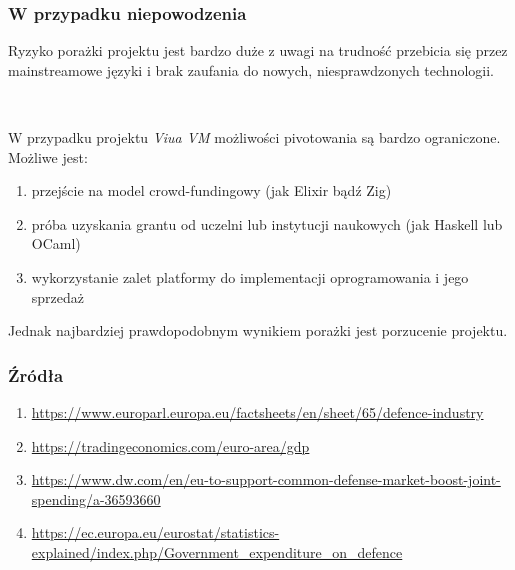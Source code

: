 \documentclass[aspectratio=169]{beamer}
\begin{document}
\begin{frame}
    \frametitle{W przypadku niepowodzenia}

    Ryzyko porażki projektu jest bardzo duże z uwagi na trudność przebicia się
    przez mainstreamowe języki i brak zaufania do nowych, niesprawdzonych
    technologii.

    ~

    W przypadku projektu \emph{Viua VM} możliwości pivotowania są bardzo
    ograniczone. Możliwe jest:

    \begin{enumerate}
        \item przejście na model crowd-fundingowy (jak Elixir bądź Zig)
        \item próba uzyskania grantu od uczelni lub instytucji naukowych (jak
            Haskell lub OCaml)
        \item wykorzystanie zalet platformy do implementacji oprogramowania i
            jego sprzedaż
    \end{enumerate}
    Jednak najbardziej prawdopodobnym wynikiem porażki jest porzucenie projektu.
\end{frame}

\begin{frame}
    \frametitle{Źródła}

    \begin{small}
    \begin{enumerate}
        \item \url{https://www.europarl.europa.eu/factsheets/en/sheet/65/defence-industry}
        \item \url{https://tradingeconomics.com/euro-area/gdp}
        \item \url{https://www.dw.com/en/eu-to-support-common-defense-market-boost-joint-spending/a-36593660}
        \item
            \url{https://ec.europa.eu/eurostat/statistics-explained/index.php/Government_expenditure_on_defence}
    \end{enumerate}
    \end{small}
\end{frame}
\end{document}
